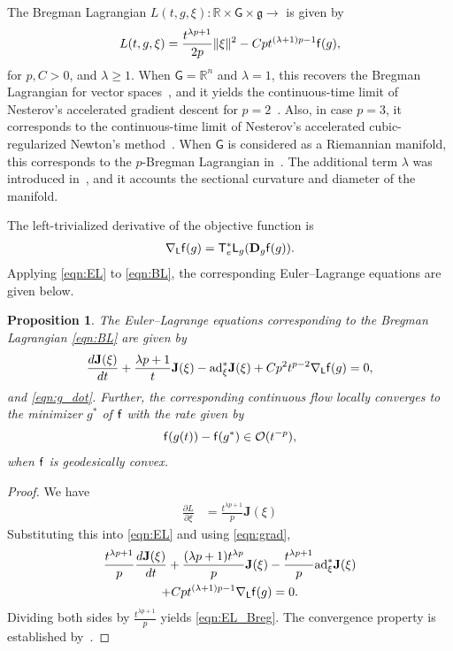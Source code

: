 \documentclass[letterpaper, 10pt, conference]{ieeeconf}
\newcommand{\deriv}[2]{\ensuremath{\frac{\partial #1}{\partial #2}}}
\newcommand{\G}{\ensuremath{\mathsf{G}}}
\newcommand{\T}{\ensuremath{\mathsf{T}}}
\renewcommand{\L}{\ensuremath{\mathsf{L}}}
\renewcommand{\Re}{\ensuremath{\mathbb{R}}}
\newcommand{\D}{\ensuremath{\mathbf{D}}}
\newcommand{\ad}{\ensuremath{\mathrm{ad}}}
\newcommand{\g}{\ensuremath{\mathfrak{g}}}
\newtheorem{prop}{Proposition}
\begin{document}
The Bregman Lagrangian $L(t,g,\xi):\Re\times\G\times\g\rightarrow$ is given by
\begin{align}
    L(t,g,\xi) = \frac{t^{\lambda p+1}}{2p} \|\xi\|^2 - C p t^{(\lambda+1)p-1} \mathsf{f} (g),\label{eqn:BL}
\end{align}
for $p, C>0$, and $\lambda\geq 1$.
When $\G=\Re^n$ and $\lambda=1$, this recovers the Bregman Lagrangian for vector spaces~\cite{wibisono2016variational}, and it yields the continuous-time limit of Nesterov's accelerated gradient descent for $p=2$~\cite{nesterov2005smooth}.
Also, in case $p = 3$, it corresponds to the continuous-time limit of Nesterov’s accelerated cubic-regularized Newton’s method~\cite{nesterov2008accelerating}.
When $\G$ is considered as a Riemannian manifold, this corresponds to the $p$-Bregman Lagrangian in~\cite{duruisseaux2021variational}.
The additional term $\lambda$ was introduced in~\cite{alimisis2020continuous}, and it accounts the sectional curvature and diameter of the manifold. 

The left-trivialized derivative of the objective function is
\begin{align}
    \nabla_\L \obj(g) = \T_e^*\L_g (\D_g \obj(g)).\label{eqn:grad}
\end{align}
Applying \eqref{eqn:EL} to \eqref{eqn:BL}, the corresponding Euler--Lagrange equations are given below.
\begin{prop}\label{prop:EL_Breg}
    The Euler--Lagrange equations corresponding to the Bregman Lagrangian \eqref{eqn:BL} are given by
    \begin{align}
        \frac{d \mathbf{J}(\xi)}{dt} + \frac{\lambda p+1}{t}\mathbf{J}(\xi) - \ad^*_\xi \mathbf{J}(\xi)
        + Cp^2 t^{p-2} \nabla_\L \obj (g) =0, \label{eqn:EL_Breg}
    \end{align}
    and \eqref{eqn:g_dot}. 
    Further, the corresponding continuous flow locally converges to the minimizer $g^*$ of $\mathsf{f}$ with the rate given by
    \begin{align}
        \mathsf{f}(g(t)) - \mathsf{f}(g^*) \in \mathcal{O}(t^{-p}),
    \end{align}
    when $\mathsf{f}$ is geodesically convex. 
\end{prop}
\begin{proof}
    We have
    \begin{align*}
        \deriv{L}{\xi} & = \frac{t^{\lambda p+1}}{p}\mathbf{J}(\xi)
    \end{align*}
    Substituting this into \eqref{eqn:EL} and using \eqref{eqn:grad}, 
    \begin{gather*}
        \frac{t^{\lambda p+1}}{p}\frac{d \mathbf{J}(\xi)}{dt} + \frac{(\lambda p+1)t^{\lambda p}}{p}\mathbf{J}(\xi) -\frac{t^{\lambda p+1}}{p} \ad^*_\xi \mathbf{J}(\xi) \\
        + Cpt^{(\lambda +1)p-1} \nabla_\L \obj(g) =0.
    \end{gather*}
    Dividing both sides by $\frac{t^{\lambda p+1}}{p}$ yields \eqref{eqn:EL_Breg}.
    The convergence property is established by~\cite[Theorem 3.2]{duruisseaux2021variational}.
\end{proof}
\end{document}
